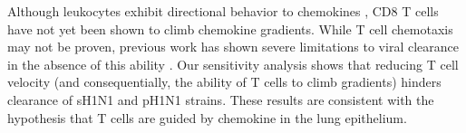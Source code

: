 \documentclass[10pt]{article}
\begin{document}
Although leukocytes exhibit directional behavior to chemokines \cite{LiJeon2002, McDonald2010}, CD8 T cells have not yet been shown to climb chemokine gradients.   While T cell chemotaxis may not be proven, previous work has shown severe limitations to viral clearance in the absence of this ability \cite{Banerjee2011}.  Our sensitivity analysis shows that reducing T cell velocity (and consequentially, the ability of T cells to climb gradients) hinders clearance of sH1N1 and pH1N1 strains.   These results are consistent with the hypothesis that T cells are guided by chemokine in the lung epithelium.







\end{document}
